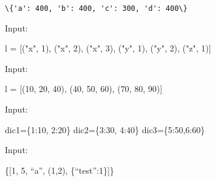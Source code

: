 \documentclass[11pt]{article}
\newenvironment{Shaded}{}{}
\newcommand{\DecValTok}[1]{\textcolor[rgb]{0.25,0.63,0.44}{{#1}}}
\newcommand{\StringTok}[1]{\textcolor[rgb]{0.25,0.44,0.63}{{#1}}}
\newcommand{\NormalTok}[1]{{#1}}
\newcommand{\OperatorTok}[1]{\textcolor[rgb]{0.40,0.40,0.40}{{#1}}}
\begin{document}
    \begin{Verbatim}[commandchars=\\\{\}]
\{'a': 400, 'b': 400, 'c': 300, 'd': 400\}
    \end{Verbatim}

    Input:

\begin{Shaded}
\begin{Highlighting}[]
\NormalTok{l }\OperatorTok{=}\NormalTok{ [(}\StringTok{"x"}\NormalTok{, }\DecValTok{1}\NormalTok{), (}\StringTok{"x"}\NormalTok{, }\DecValTok{2}\NormalTok{), (}\StringTok{"x"}\NormalTok{, }\DecValTok{3}\NormalTok{), (}\StringTok{"y"}\NormalTok{, }\DecValTok{1}\NormalTok{), (}\StringTok{"y"}\NormalTok{, }\DecValTok{2}\NormalTok{), (}\StringTok{"z"}\NormalTok{, }\DecValTok{1}\NormalTok{)]}
\end{Highlighting}
\end{Shaded}

Input:

\begin{Shaded}
\begin{Highlighting}[]
\NormalTok{l }\OperatorTok{=}\NormalTok{ [(}\DecValTok{10}\NormalTok{, }\DecValTok{20}\NormalTok{, }\DecValTok{40}\NormalTok{), (}\DecValTok{40}\NormalTok{, }\DecValTok{50}\NormalTok{, }\DecValTok{60}\NormalTok{), (}\DecValTok{70}\NormalTok{, }\DecValTok{80}\NormalTok{, }\DecValTok{90}\NormalTok{)]}
\end{Highlighting}
\end{Shaded}

Input:

\begin{Shaded}
\begin{Highlighting}[]
\NormalTok{dic1}\OperatorTok{=}\NormalTok{\{}\DecValTok{1}\NormalTok{:}\DecValTok{10}\NormalTok{, }\DecValTok{2}\NormalTok{:}\DecValTok{20}\NormalTok{\}}
\NormalTok{dic2}\OperatorTok{=}\NormalTok{\{}\DecValTok{3}\NormalTok{:}\DecValTok{30}\NormalTok{, }\DecValTok{4}\NormalTok{:}\DecValTok{40}\NormalTok{\}}
\NormalTok{dic3}\OperatorTok{=}\NormalTok{\{}\DecValTok{5}\NormalTok{:}\DecValTok{50}\NormalTok{,}\DecValTok{6}\NormalTok{:}\DecValTok{60}\NormalTok{\}}
\end{Highlighting}
\end{Shaded}

Input:

\begin{Shaded}
\begin{Highlighting}[]
\NormalTok{\{[}\DecValTok{1}\NormalTok{, }\DecValTok{5}\NormalTok{, ``a}\StringTok{''}\NormalTok{, (}\DecValTok{1}\NormalTok{,}\DecValTok{2}\NormalTok{), \{``test}\StringTok{''}\NormalTok{:}\DecValTok{1}\NormalTok{\}]\}}
\end{Highlighting}
\end{Shaded}
\end{document}
